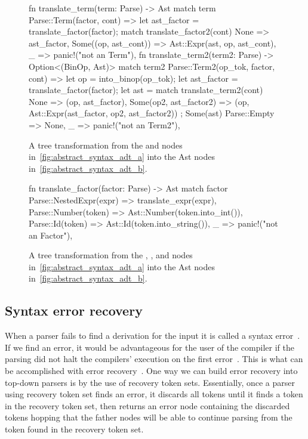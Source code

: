 \documentclass[
  oneside,
  english,
  coorientadorbanca,
  noabntexcite
]{ufsc-thesis-rn46-2019}
\newcommand{\code}[1]{\text{\scpfamily\setlength\spaceskip{0.35em}#1}}
\begin{document}
\begin{figure}[ht]
  \centering
  \begin{minipage}{0.9\textwidth}
    \begin{rustcode}
fn translate_term(term: Parse) -> Ast {
  match term {
    Parse::Term(factor, cont) => {
      let ast_factor = translate_factor(factor);
      match translate_factor2(cont) {
        None => ast_factor,
        Some((op, ast_cont)) => Ast::Expr(ast, op, ast_cont),
      }
    }
    _ => panic!("not an Term"),
  }
}
fn translate_term2(term2: Parse) -> Option<(BinOp, Ast)> {
  match term2 {
    Parse::Term2(op_tok, factor, cont) => {
      let op = into_binop(op_tok);
      let ast_factor = translate_factor(factor);
      let ast = match translate_term2(cont) {
        None => (op, ast_factor),
        Some(op2, ast_factor2) => {
          (op, Ast::Expr(ast_factor, op2, ast_factor2))
        }
      };
      Some(ast)
    }
    Parse::Empty => None,
    _ => panic!("not an Term2"),
  }
}
    \end{rustcode}
  \end{minipage}
  \caption{
    A tree transformation from the \code{Term} and \code{Term2} nodes in~\cref{fig:abstract_syntax_adt_a} into the Ast nodes in~\cref{fig:abstract_syntax_adt_b}.
  }\label{fig:cst_ast_translator_term}
\end{figure}

\begin{figure}[ht]
  \centering
  \begin{minipage}{0.9\textwidth}
    \begin{rustcode}
fn translate_factor(factor: Parse) -> Ast {
  match factor {
    Parse::NestedExpr(expr) => translate_expr(expr),
    Parse::Number(token) => Ast::Number(token.into_int()),
    Parse::Id(token) => Ast::Id(token.into_string()),
    _ => panic!("not an Factor"),
  }
}
    \end{rustcode}
  \end{minipage}
  \caption{
    A tree transformation from the \code{NestedExpr}, \code{Number}, and \code{Id} nodes in~\cref{fig:abstract_syntax_adt_a} into the Ast nodes in~\cref{fig:abstract_syntax_adt_b}.
  }\label{fig:cst_ast_translator_factor}
\end{figure}

\subsection{Syntax error recovery}

When a parser fails to find a derivation for the input it is called a syntax error~\cite{appel2003modern}.
If we find an error, it would be advantageous for the user of the compiler if the parsing did not halt the compilers' execution on the first error~\cite{appel2003modern}.
This is what can be accomplished with error recovery~\cite{appel2003modern}.
One way we can build error recovery into top-down parsers is by the use of recovery token sets.
Essentially, once a parser using recovery token set finds an error, it discards all tokens until it finds a token in the recovery token set, then returns an error node containing the discarded tokens hopping that the father nodes will be able to continue parsing from the token found in the recovery token set.
\end{document}

